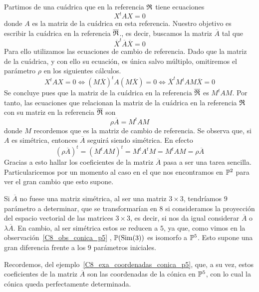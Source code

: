 Partimos de una cuádrica que en la referencia $\mathfrak{R}$ tiene ecuaciones
\begin{equation}
X^tAX=0
\end{equation}
donde $A$ es la matriz de la cuádrica en esta referencia. Nuestro objetivo es escribir la cuádrica en la referencia $\overline{\mathfrak{R}}$., es decir, buscamos la matriz $\overline{A}$ tal que
\begin{equation}
\overline{X}^t\overline{A}\overline{X}=0
\end{equation}
Para ello utilizamos las ecuaciones de cambio de referencia. Dado que la matriz de la cuádrica, y con ello su ecuación, es única salvo múltiplo, omitiremos el parámetro $\rho$ en los siguientes cálculos.
\begin{equation}
X^tAX=0\Leftrightarrow (M\overline{X})^tA(M\overline{X})=0\Leftrightarrow \overline{X}^t M^tAM\overline{X}=0
\end{equation}
Se concluye pues que la matriz de la cuádrica en la referencia $\overline{\mathfrak{R}}$ es $M^tAM$. Por tanto, las ecuaciones que relacionan la matriz de la cuádrica en la referencia ${\mathfrak{R}}$ con su matriz en la referencia $\overline{\mathfrak{R}}$ son
\begin{equation}
\label{C8_eq_relacionMatrices_referencias}
\rho\overline{A}=M^tAM
\end{equation}
donde $M$ recordemos que es la matriz de cambio de referencia. Se observa que, si $A$ es simétrica, entonces $\overline{A}$ seguirá siendo simétrica. En efecto
\begin{equation}
(\rho\overline{A})^t=(M^tAM)^t=M^tA^tM=M^tAM=\rho\overline{A}
\end{equation}
Gracias a esto hallar los coeficientes de la matriz $\overline{A}$ pasa a ser una tarea sencilla. Particularicemos por un momento al caso en el que nos encontramos en $\mathbb{P}^2$ para ver el gran cambio que esto supone.

Si $\overline{A}$ no fuese una matriz simétrica, al ser una matriz $3\times 3$, tendríamos $9$ parámetro a determinar, que se transformarían en $8$ si consideramos la proyección del espacio vectorial de las matrices $3\times 3$, es decir, si nos da igual considerar $\overline{A}$ o $\lambda\overline{A}$. En cambio, al ser simétrica estos se reducen a $5$, ya que, como vimos en la observación~\ref{C8_obs_conica_p5} , $\mathbb{P}(\mathrm{Sim}(3))$ es isomorfo a $\mathbb{P}^5$. Esto supone una gran diferencia frente a los $9$ parámetros iniciales. 

Recordemos, del ejemplo~\ref{C8_exa_coordenadas_conica_p5}, que, a su vez, estos coeficientes de la matriz $\overline{A}$ son las coordenadas de la cónica en $\mathbb{P}^5$, con lo cual la cónica queda perfectamente determinada.\\

